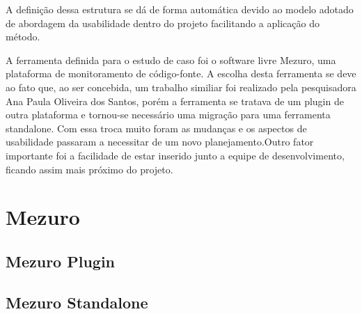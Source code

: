 %
A definição dessa estrutura se dá de forma automática devido ao modelo adotado de abordagem da usabilidade dentro do projeto facilitando a aplicação do método.

A ferramenta definida para o estudo de caso foi o software livre Mezuro, uma plataforma de monitoramento de código-fonte. A escolha desta ferramenta se deve ao fato que, ao ser concebida, um trabalho similiar foi realizado pela pesquisadora Ana Paula Oliveira dos Santos, porém a ferramenta se tratava de um plugin de outra plataforma e tornou-se necessário uma migração para uma ferramenta standalone. Com essa troca muito foram as mudanças e os aspectos de usabilidade passaram a necessitar de um novo planejamento.Outro fator importante foi a facilidade de estar inserido junto a equipe de desenvolvimento, ficando assim mais próximo do projeto.

\section{Mezuro}
\label{mezuro}

\subsection{Mezuro Plugin}
\label{mezuro-plugin}

\subsection{Mezuro Standalone}
\label{mezuro-standalone}